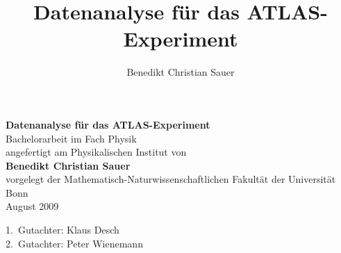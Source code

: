 \documentclass[a4paper,oneside]{scrartcl}
\author{Benedikt Christian Sauer}
\title{Datenanalyse für das ATLAS-Experiment}
\begin{document}
\begin{titlepage}
  \begin{center}
    \vspace{12cm}
    \Huge{\bf\textsf{Datenanalyse für das ATLAS-Experiment}} \\
    \vspace{2cm}
    \Large Bachelorarbeit im Fach Physik \\
    \vspace{1cm}
    \normalsize angefertigt am Physikalischen Institut von \\
    \vspace{1cm}
    \large{\bf Benedikt Christian Sauer} \\
    \vspace{2cm}
    \normalsize vorgelegt der Mathematisch-Naturwissenschaftlichen Fakultät der Universität
    Bonn \\
    \vspace{1cm}
    \large August 2009
  \end{center}
\end{titlepage}
\newpage
\tableofcontents
\vspace{4cm}
\begin{center}
  \large 1.\ Gutachter: Klaus Desch \\
  \large 2.\ Gutachter: Peter Wienemann
\end{center}
\newpage




\end{document}
